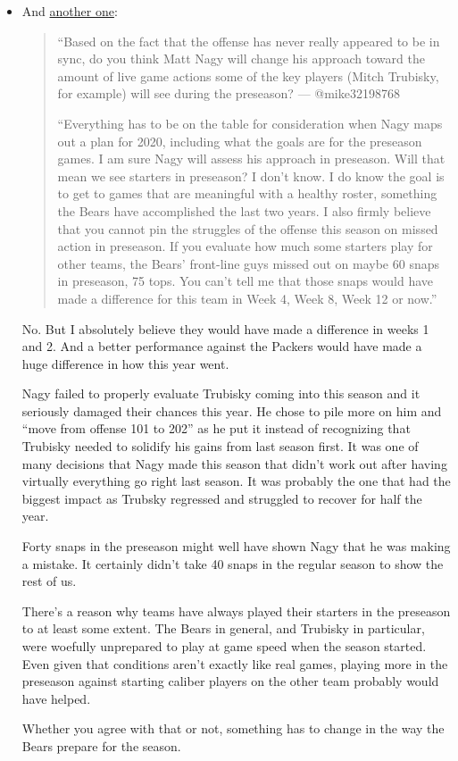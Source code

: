 \documentclass[11pt]{article}
\begin{document}
\begin{itemize}
\item And \href{https://www.chicagotribune.com/sports/bears/ct-cb-chicago-bears-mailbag-mitch-trubisky-offensive-line-20191218-33a7ey47aja67p27sh2t5kwube-story.html}{another one}:

  \begin{quote}
  ``Based on the fact that the offense has never really appeared to be in sync, do you think Matt Nagy will change his approach toward the amount of live game actions some of the key players (Mitch Trubisky, for example) will see during the preseason? — @mike32198768

``Everything has to be on the table for consideration when Nagy maps out a plan for 2020, including what the goals are for the preseason games. I am sure Nagy will assess his approach in preseason. Will that mean we see starters in preseason? I don’t know. I do know the goal is to get to games that are meaningful with a healthy roster, something the Bears have accomplished the last two years. I also firmly believe that you cannot pin the struggles of the offense this season on missed action in preseason. If you evaluate how much some starters play for other teams, the Bears’ front-line guys missed out on maybe 60 snaps in preseason, 75 tops. You can’t tell me that those snaps would have made a difference for this team in Week 4, Week 8, Week 12 or now.''
\end{quote}

No.  But I absolutely believe they would have made a difference in weeks 1 and 2.  And a better performance against the Packers would have made a huge difference in how this year went.

Nagy failed to properly evaluate Trubisky coming into this season and it seriously damaged their chances this year.  He chose to pile more on him and ``move from offense 101 to 202'' as he put it instead of recognizing that Trubisky needed to solidify his gains from last season first.  It was one of many decisions that Nagy made this season that didn't work out after having virtually everything go right last season.  It was probably the one that had the biggest impact as Trubsky regressed and struggled to recover for half the year.

Forty snaps in the preseason might well have shown Nagy that he was making a mistake.  It certainly didn't take 40 snaps in the regular season to show the rest of us.

There's a reason why teams have always played their starters in the preseason to at least some extent.  The Bears in general, and Trubisky in particular, were woefully unprepared to play at game speed when the season started.  Even given that conditions aren't exactly like real games, playing more in the preseason against starting caliber players on the other team probably would have helped.

Whether you agree with that or not, something has to change in the way the Bears prepare for the season.

\end{itemize}
\end{document}
